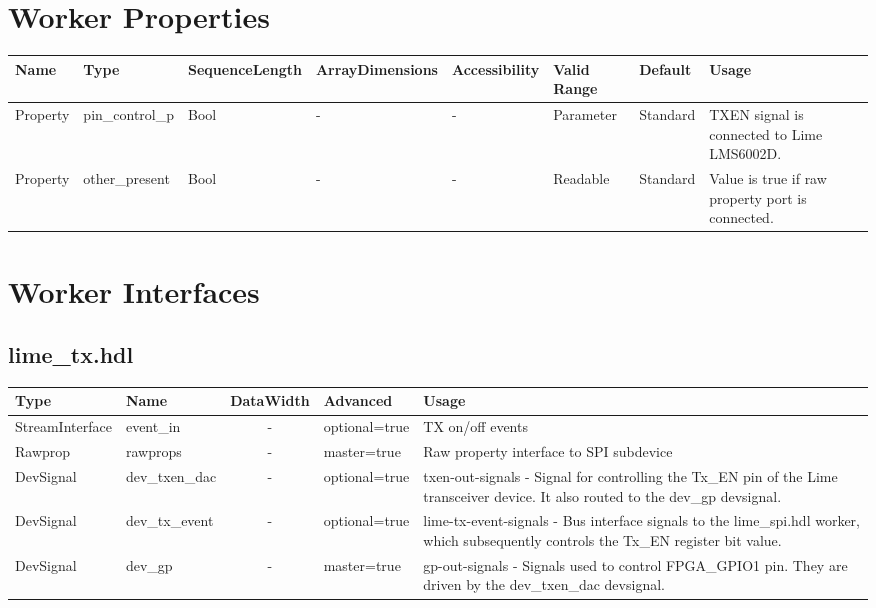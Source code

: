 \documentclass{article}
\def\comp{lime\_tx}
\begin{document}
\begin{landscape}
  \section*{Worker Properties}
  \begin{scriptsize}
    \begin{tabular}{|p{2.5cm}|p{1.5cm}|p{2cm}|p{2.75cm}|p{1.5cm}|p{1.5cm}|p{1.2cm}|p{6.74cm}|}
      \hline
      \rowcolor{blue}
      Name               & Type & SequenceLength & ArrayDimensions & Accessibility      & Valid Range & Default & Usage                                                                               \\
      \hline
      Property & pin\_control\_p 	& Bool 	& - 				& - 				& Parameter		& Standard 		& TXEN signal is connected to Lime LMS6002D. \\
      \hline
      Property & other\_present 	& Bool 	& - 				& - 				& Readable 		& Standard 		& Value is true if raw property port is connected. \\
      \hline
    \end{tabular}
  \end{scriptsize}

  \section*{Worker Interfaces}
  \subsection*{\comp.hdl}
	\begin{scriptsize}
		\begin{tabular}{|M{3cm}|M{1.5cm}|c|M{3cm}|M{12cm}|}
			\hline
			Type            & Name 		& DataWidth & Advanced   	& Usage                                    	\\
			\hline
			StreamInterface & event\_in & -        	& optional=true	& TX on/off events							\\
			\hline
			Rawprop 		& rawprops  & -       	& master=true   & Raw property interface to SPI subdevice	\\
			\hline
			DevSignal & dev\_txen\_dac  & -    & optional=true    &  txen-out-signals - Signal for controlling the Tx\_EN pin of the Lime transceiver device. It also routed to the dev\_gp devsignal. \\
			\hline
			DevSignal & dev\_tx\_event  & -   & optional=true      &  lime-tx-event-signals - Bus interface signals to the lime\_spi.hdl worker, which subsequently controls the Tx\_EN register bit value.\\
			\hline
			DevSignal & dev\_gp  & -   & master=true     &  gp-out-signals - Signals used to control FPGA\_GPIO1 pin. They are driven by the dev\_txen\_dac devsignal. \\
			\hline
		\end{tabular}
	\end{scriptsize}

\end{landscape}
\end{document}
